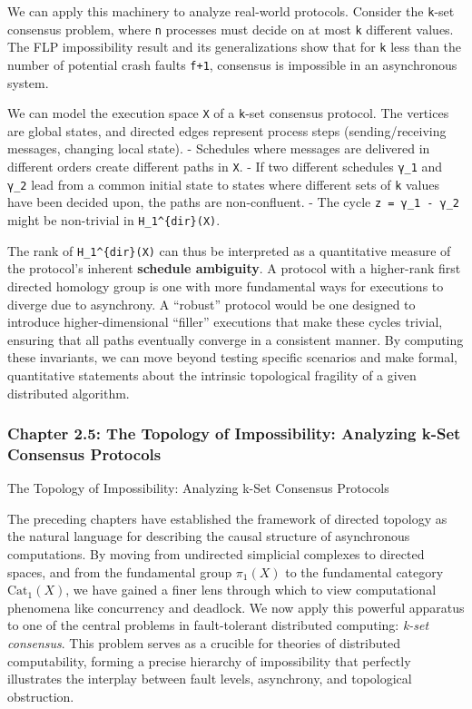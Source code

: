 \documentclass[
]{article}
\begin{document}
We can apply this machinery to analyze real-world protocols. Consider
the \texttt{k}-set consensus problem, where \texttt{n} processes must
decide on at most \texttt{k} different values. The FLP impossibility
result and its generalizations show that for \texttt{k} less than the
number of potential crash faults \texttt{f+1}, consensus is impossible
in an asynchronous system.

We can model the execution space \texttt{X} of a \texttt{k}-set
consensus protocol. The vertices are global states, and directed edges
represent process steps (sending/receiving messages, changing local
state). - Schedules where messages are delivered in different orders
create different paths in \texttt{X}. - If two different schedules
\texttt{γ\_1} and \texttt{γ\_2} lead from a common initial state to
states where different sets of \texttt{k} values have been decided upon,
the paths are non-confluent. - The cycle \texttt{z\ =\ γ\_1\ -\ γ\_2}
might be non-trivial in \texttt{H\_1\^{}\{dir\}(X)}.

The rank of \texttt{H\_1\^{}\{dir\}(X)} can thus be interpreted as a
quantitative measure of the protocol's inherent \textbf{schedule
ambiguity}. A protocol with a higher-rank first directed homology group
is one with more fundamental ways for executions to diverge due to
asynchrony. A ``robust'' protocol would be one designed to introduce
higher-dimensional ``filler'' executions that make these cycles trivial,
ensuring that all paths eventually converge in a consistent manner. By
computing these invariants, we can move beyond testing specific
scenarios and make formal, quantitative statements about the intrinsic
topological fragility of a given distributed algorithm.

\subsubsection{Chapter 2.5: The Topology of Impossibility: Analyzing
k-Set Consensus
Protocols}\label{chapter-2.5-the-topology-of-impossibility-analyzing-k-set-consensus-protocols}

\protect{}\label{chapter-2-5-The_Topology_of_Impossibility__Analyzing}{}

The Topology of Impossibility: Analyzing k-Set Consensus Protocols

The preceding chapters have established the framework of directed
topology as the natural language for describing the causal structure of
asynchronous computations. By moving from undirected simplicial
complexes to directed spaces, and from the fundamental group
\(\pi_1(X)\) to the fundamental category \(\text{Cat}_1(X)\), we have
gained a finer lens through which to view computational phenomena like
concurrency and deadlock. We now apply this powerful apparatus to one of
the central problems in fault-tolerant distributed computing:
\emph{k-set consensus}. This problem serves as a crucible for theories
of distributed computability, forming a precise hierarchy of
impossibility that perfectly illustrates the interplay between fault
levels, asynchrony, and topological obstruction.
\end{document}
